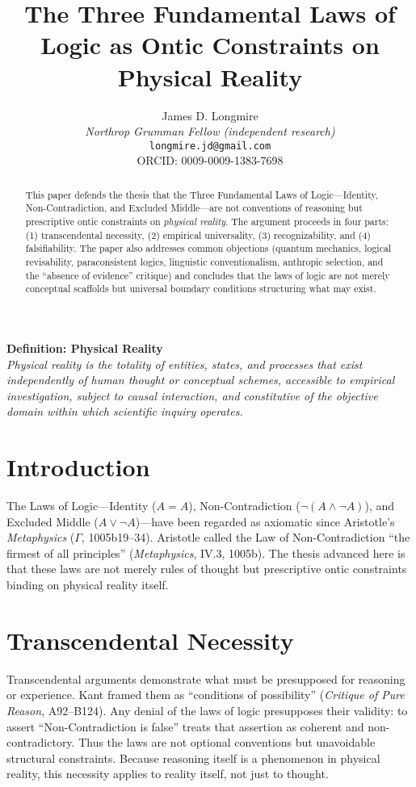 \documentclass[12pt]{article}
\title{The Three Fundamental Laws of Logic as Ontic Constraints on Physical Reality}
\author{James D. Longmire \\
  \textit{Northrop Grumman Fellow (independent research)} \\
  \texttt{longmire.jd@gmail.com} \\
  ORCID: {0009-0009-1383-7698}
}
\date{}
\begin{document}
\maketitle

\begin{abstract}
This paper defends the thesis that the Three Fundamental Laws of Logic---Identity, Non-Contradiction, and Excluded Middle---are not conventions of reasoning but prescriptive ontic constraints on \emph{physical reality}. The argument proceeds in four parts: (1) transcendental necessity, (2) empirical universality, (3) recognizability, and (4) falsifiability. The paper also addresses common objections (quantum mechanics, logical revisability, paraconsistent logics, linguistic conventionalism, anthropic selection, and the ``absence of evidence'' critique) and concludes that the laws of logic are not merely conceptual scaffolds but universal boundary conditions structuring what may exist.
\end{abstract}

\begin{framed}
\noindent \textbf{Definition: Physical Reality} \\
\emph{Physical reality is the totality of entities, states, and processes that exist independently of human thought or conceptual schemes, accessible to empirical investigation, subject to causal interaction, and constitutive of the objective domain within which scientific inquiry operates.}
\end{framed}

\section{Introduction}
The Laws of Logic---Identity ($A = A$), Non-Contradiction ($\lnot (A \land \lnot A)$), and Excluded Middle ($A \lor \lnot A$)---have been regarded as axiomatic since Aristotle’s \emph{Metaphysics} ($\Gamma$, 1005b19--34). Aristotle called the Law of Non-Contradiction ``the firmest of all principles'' (\emph{Metaphysics}, IV.3, 1005b). The thesis advanced here is that these laws are not merely rules of thought but prescriptive ontic constraints binding on physical reality itself.

\section{Transcendental Necessity}
Transcendental arguments demonstrate what must be presupposed for reasoning or experience. Kant framed them as ``conditions of possibility'' (\emph{Critique of Pure Reason}, A92--B124). Any denial of the laws of logic presupposes their validity: to assert ``Non-Contradiction is false'' treats that assertion as coherent and non-contradictory. Thus the laws are not optional conventions but unavoidable structural constraints. Because reasoning itself is a phenomenon in physical reality, this necessity applies to reality itself, not just to thought.
\end{document}

